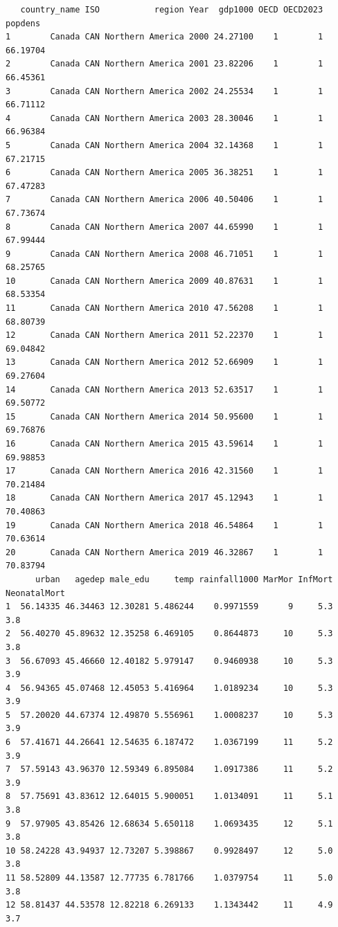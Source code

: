 \documentclass[
  letterpaper,
  DIV=11,
  numbers=noendperiod]{scrartcl}
\begin{document}
\begin{verbatim}
   country_name ISO           region Year  gdp1000 OECD OECD2023  popdens
1        Canada CAN Northern America 2000 24.27100    1        1 66.19704
2        Canada CAN Northern America 2001 23.82206    1        1 66.45361
3        Canada CAN Northern America 2002 24.25534    1        1 66.71112
4        Canada CAN Northern America 2003 28.30046    1        1 66.96384
5        Canada CAN Northern America 2004 32.14368    1        1 67.21715
6        Canada CAN Northern America 2005 36.38251    1        1 67.47283
7        Canada CAN Northern America 2006 40.50406    1        1 67.73674
8        Canada CAN Northern America 2007 44.65990    1        1 67.99444
9        Canada CAN Northern America 2008 46.71051    1        1 68.25765
10       Canada CAN Northern America 2009 40.87631    1        1 68.53354
11       Canada CAN Northern America 2010 47.56208    1        1 68.80739
12       Canada CAN Northern America 2011 52.22370    1        1 69.04842
13       Canada CAN Northern America 2012 52.66909    1        1 69.27604
14       Canada CAN Northern America 2013 52.63517    1        1 69.50772
15       Canada CAN Northern America 2014 50.95600    1        1 69.76876
16       Canada CAN Northern America 2015 43.59614    1        1 69.98853
17       Canada CAN Northern America 2016 42.31560    1        1 70.21484
18       Canada CAN Northern America 2017 45.12943    1        1 70.40863
19       Canada CAN Northern America 2018 46.54864    1        1 70.63614
20       Canada CAN Northern America 2019 46.32867    1        1 70.83794
      urban   agedep male_edu     temp rainfall1000 MarMor InfMort NeonatalMort
1  56.14335 46.34463 12.30281 5.486244    0.9971559      9     5.3          3.8
2  56.40270 45.89632 12.35258 6.469105    0.8644873     10     5.3          3.8
3  56.67093 45.46660 12.40182 5.979147    0.9460938     10     5.3          3.9
4  56.94365 45.07468 12.45053 5.416964    1.0189234     10     5.3          3.9
5  57.20020 44.67374 12.49870 5.556961    1.0008237     10     5.3          3.9
6  57.41671 44.26641 12.54635 6.187472    1.0367199     11     5.2          3.9
7  57.59143 43.96370 12.59349 6.895084    1.0917386     11     5.2          3.9
8  57.75691 43.83612 12.64015 5.900051    1.0134091     11     5.1          3.8
9  57.97905 43.85426 12.68634 5.650118    1.0693435     12     5.1          3.8
10 58.24228 43.94937 12.73207 5.398867    0.9928497     12     5.0          3.8
11 58.52809 44.13587 12.77735 6.781766    1.0379754     11     5.0          3.8
12 58.81437 44.53578 12.82218 6.269133    1.1343442     11     4.9          3.7

\end{verbatim}
\end{document}
